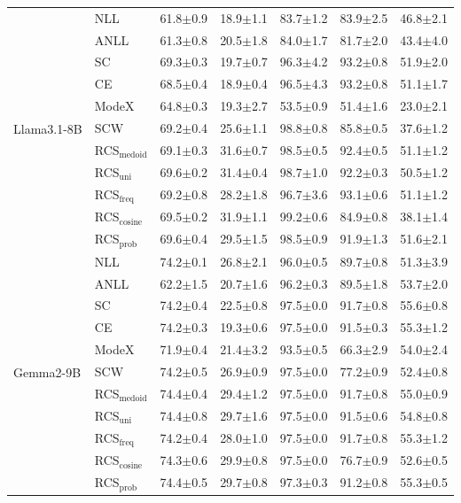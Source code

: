 \begin{table}[t]
{\begin{tabular}{ll|ccccc}
    \multirow{11}{*}{Llama3.1-8B}
    & NLL & 61.8$\pm$0.9	&18.9$\pm$1.1&	83.7$\pm$1.2	&83.9$\pm$2.5&	46.8$\pm$2.1\\
    & ANLL & 61.3$\pm$0.8	&20.5$\pm$1.8&	84.0$\pm$1.7&	81.7$\pm$2.0&	43.4$\pm$4.0\\
    & SC  & 69.3$\pm$0.3	&19.7$\pm$0.7&	96.3$\pm$4.2&	93.2$\pm$0.8&	51.9$\pm$2.0\\
    & CE    & 68.5$\pm$0.4&	18.9$\pm$0.4&	96.5$\pm$4.3&	93.2$\pm$0.8&	51.1$\pm$1.7\\
    & ModeX    & 64.8$\pm$0.3&	19.3$\pm$2.7&	53.5$\pm$0.9&	51.4$\pm$1.6	&23.0$\pm$2.1\\
    & SCW & 69.2$\pm$0.4 & 25.6$\pm$1.1 & 98.8$\pm$0.8 & 85.8$\pm$0.5 & 37.6$\pm$1.2\\
    & RCS$_\text{medoid}$  &69.1$\pm$0.3	&31.6$\pm$0.7&	98.5$\pm$0.5&	92.4$\pm$0.5	&51.1$\pm$1.2\\
    & RCS$_\text{uni}$& 69.6$\pm$0.2	&31.4$\pm$0.4	&98.7$\pm$1.0&	92.2$\pm$0.3&	50.5$\pm$1.2\\
    &  RCS$_\text{freq}$&69.2$\pm$0.8&	28.2$\pm$1.8	&96.7$\pm$3.6&	93.1$\pm$0.6&	51.1$\pm$1.2\\
    & RCS$_\text{cosine}$ & 69.5$\pm$0.2 & 31.9$\pm$1.1 & 99.2$\pm$0.6 & 84.9$\pm$0.8 & 38.1$\pm$1.4\\
    &  RCS$_\text{prob}$  &69.6$\pm$0.4&	29.5$\pm$1.5&	98.5$\pm$0.9&91.9$\pm$1.3	&51.6$\pm$2.1\\
    \midrule

    \multirow{11}{*}{Gemma2-9B}
    & NLL & 74.2$\pm$0.1	&26.8$\pm$2.1&	96.0$\pm$0.5	&89.7$\pm$0.8&51.3$\pm$3.9\\
    & ANLL & 62.2$\pm$1.5	&20.7$\pm$1.6&	96.2$\pm$0.3&	89.5$\pm$1.8&	53.7$\pm$2.0\\
    & SC  & 	74.2$\pm$0.4	&22.5$\pm$0.8	&97.5$\pm$0.0	&91.7$\pm$0.8&	55.6$\pm$0.8\\
    & CE    & 74.2$\pm$0.3	&19.3$\pm$0.6&	97.5$\pm$0.0	&91.5$\pm$0.3	&55.3$\pm$1.2\\
    & ModeX    & 71.9$\pm$0.4 &	21.4$\pm$3.2&	93.5$\pm$0.5	&66.3$\pm$2.9	&54.0$\pm$2.4\\
    & SCW & 74.2$\pm$0.5 & 26.9$\pm$0.9 & 97.5$\pm$0.0 & 77.2$\pm$0.9 & 52.4$\pm$0.8\\
    & RCS$_\text{medoid}$  &74.4$\pm$0.4&	29.4$\pm$1.2	&97.5$\pm$0.0	&91.7$\pm$0.8&	55.0$\pm$0.9\\
    & RCS$_\text{uni}$& 74.4$\pm$0.8	&29.7$\pm$1.6&	97.5$\pm$0.0&	91.5$\pm$0.6	&54.8$\pm$0.8\\
    &  RCS$_\text{freq}$&74.2$\pm$0.4&	28.0$\pm$1.0	&97.5$\pm$0.0	&91.7$\pm$0.8	&55.3$\pm$1.2\\
    & RCS$_\text{cosine}$ & 74.3$\pm$0.6 & 29.9$\pm$0.8 & 97.5$\pm$0.0 & 76.7$\pm$0.9 & 52.6$\pm$0.5\\
    &  RCS$_\text{prob}$  &74.4$\pm$0.5&	29.7$\pm$0.8	&97.3$\pm$0.3&	91.2$\pm$0.8&	55.3$\pm$0.5\\
    
    \bottomrule
  \end{tabular}}
\end{table}
